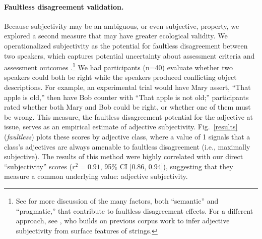 \documentclass[12pt]{article}
\newcommand{\gcs}[1]{\textcolor{blue}{[gcs: #1]}}
\begin{document}
\paragraph{Faultless disagreement validation.} Because subjectivity may be an ambiguous, or even subjective, property, we explored a second measure that may have greater ecological validity. 
We operationalized subjectivity as the potential for faultless disagreement between two speakers, which captures potential uncertainty about assessment criteria and assessment outcomes \citep{Kolbel2004,kennedy2013,barker2013}.\footnote{See \cite{MacFarlane2014} for more discussion of the many factors, both ``semantic'' and ``pragmatic,'' that contribute to faultless disagreement effects. For a different approach, see \cite{hill2012}, who builds on previous corpus work \citep{wulff2003} to infer adjective subjectivity from surface features of strings.}
We had participants (n=40) evaluate whether two speakers could both be right while the speakers produced conflicting object descriptions. For example, an experimental trial would have Mary assert, ``That apple is old,'' then have Bob counter with ``That apple is not old;'' 
participants rated whether both Mary and Bob could be right, or whether one of them must be wrong. This measure, the faultless disagreement potential for the adjective at issue, serves as an empirical estimate of adjective subjectivity. 
Fig.\ \ref{results} (\emph{faultless}) plots these scores by adjective class, where a value of 1 signals that a class's adjectives are always amenable to faultless disagreement (i.e., maximally subjective). 
The results of this method were highly correlated with our direct ``subjectivity'' scores ($r^{2} = 0.91$, 95\% CI [0.86, 0.94]), suggesting that they measure a common underlying value: adjective subjectivity. 

\end{document}
